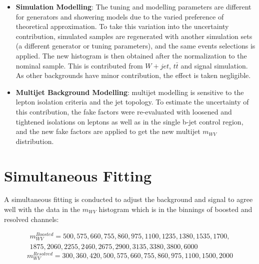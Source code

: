 \begin{itemize}
	\item{\bf Simulation Modelling}: The tuning and modelling parameters are different for generators and showering models due to the varied preference of theoretical approximation. To take this variation into the uncertainty contribution, simulated samples are regenerated with another simulation sets (a different generator or tuning parameters), and the same events selections is applied. The new histogram is then obtained after the normalization to the nominal sample. This is contributed from $W+jet$, $t\bar{t}$ and signal simulation. As other backgrounds have minor contribution, the effect is taken negligible.

	\item{\bf Multijet Background Modelling}: multijet modelling is sensitive to the lepton isolation criteria and the jet topology. To estimate the uncertainty of this contribution, the fake factors were re-evaluated with loosened and tightened isolations on leptons as well as in the single b-jet control region, and the new fake factors are applied to get the new multijet $m_{WV}$ distribution.
\end{itemize}
\section{Simultaneous Fitting}
A simultaneous fitting is conducted to adjust the background and signal to agree well with the data in the $m_{WV}$ histogram which is in the binnings of boosted and resolved channels:

\begin{multline}
m^{Boosted}_{WV}= 500, 575, 660, 755, 860, 975, 1100, 1235, 1380, 1535, 1700,\\ 1875, 2060, 2255, 2460, 2675, 2900, 3135, 3380, 3800, 6000
\end{multline}
\noindent
\begin{equation}
m^{Resolved}_{WV}= 300, 360, 420, 500, 575, 660, 755, 860, 975, 1100, 1500, 2000
\end{equation}

